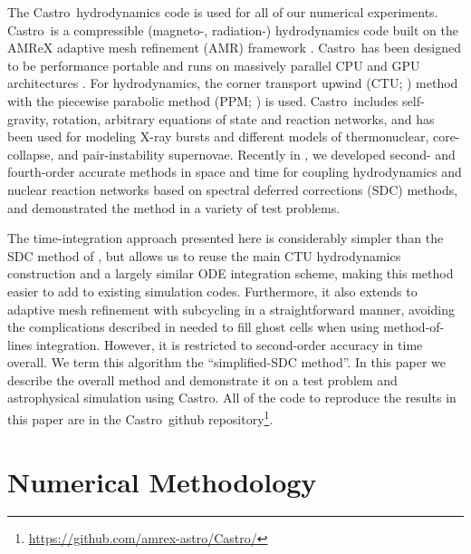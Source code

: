 \documentclass[times,preprint]{aastex631}
\newcommand{\castro}{{\sf Castro}}
\newcommand{\MarginPar}[1]{\marginpar{\vskip-\baselineskip\raggedright\tiny\sffamily\hrule\smallskip{\color{red}#1}\par\smallskip\hrule}}
\begin{document}
The \castro\ hydrodynamics code \citep{castro,castro_joss} is used for
all of our numerical experiments.  \castro\ is a compressible
(magneto-, radiation-) hydrodynamics code built on the AMReX adaptive
mesh refinement (AMR) framework \citep{amrex_joss}.  \castro\ has been
designed to be performance portable and runs on massively parallel CPU
and GPU architectures \citep{castro_gpu}.  For hydrodynamics, the
corner transport upwind (CTU; \citealt{ppmunsplit}) method with the
piecewise parabolic method (PPM; \citealt{ppm,millercolella:2002}) is
used.  \castro\ includes self-gravity, rotation, arbitrary equations
of state and reaction networks, and has been used for modeling X-ray
bursts and different models of thermonuclear, core-collapse, and
pair-instability supernovae.  Recently in \citet{castro_sdc}, we
developed second- and fourth-order accurate methods in space and time
for coupling hydrodynamics and nuclear reaction networks based on
spectral deferred corrections (SDC) methods, and demonstrated the
method in a variety of test problems.

The time-integration approach presented here is considerably simpler
than the SDC method of \citet{castro_sdc}, but allows us to reuse the
main CTU \MarginPar{any cites to CCSE papers?}  hydrodynamics
construction and a largely similar ODE integration scheme, making this
method easier to add to existing simulation codes.  Furthermore, it
also extends to adaptive mesh refinement with subcycling in a
straightforward manner, avoiding the complications described in
\citep{mccorquodalecolella} needed to fill ghost cells when using
method-of-lines integration.  However, it is restricted to
second-order accuracy in time overall.  We term this algorithm the
``simplified-SDC method''.  In this paper we describe the overall
method and demonstrate it on a test problem and astrophysical
simulation using \castro.  All of the code to reproduce the results in
this paper are in the \castro\ github
repository\footnote{\url{https://github.com/amrex-astro/Castro/}}.

\section{Numerical Methodology}
\end{document}

